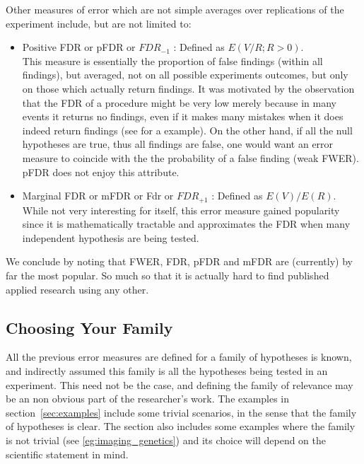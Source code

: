 \documentclass[review,12pt]{article}
\begin{document}
Other measures of error which are not simple averages over replications of the experiment include, but are not limited to:
\begin{itemize}

\item Positive FDR or pFDR \citep{storey_direct_2002} or $FDR_{-1}$ \citep{benjamini_discovering_2010} : Defined as $E(V/R;R>0)$.\\
This measure is essentially the proportion of false findings (within all findings), but averaged, not on all possible experiments outcomes, but only on those which actually return findings. It was motivated by the observation that the FDR of a procedure might be very low merely because in many events it returns no findings, even if it makes many mistakes when it does indeed return findings (see \citep{storey_direct_2002} for a example). 
On the other hand, if all the null hypotheses are true, thus all findings are false, one would want an error measure to coincide with the the probability of a false finding (weak FWER). pFDR does not enjoy this attribute.

\item Marginal FDR or mFDR \citep{sun_oracle_2007} or Fdr \citep{efron_microarrays_2008} or $FDR_{+1}$ \citep{benjamini_discovering_2010}: Defined as $E(V)/E(R)$. \\
While not very interesting for itself, this error measure gained popularity since it is mathematically tractable and approximates the FDR when many independent hypothesis are being tested. 

\end{itemize}


We conclude by noting that FWER, FDR, pFDR and mFDR are (currently) by far the most popular. So much so that it is actually hard to find published applied research using any other. 



\subsection{Choosing Your Family}
All the previous error measures are defined for a family of hypotheses is known, and indirectly assumed this family is all the hypotheses being tested in an experiment. This need not be the case, and defining the family of relevance may be an non obvious part of the researcher's work. The examples in section~\ref{sec:examples} include some trivial scenarios, in the sense that the family of hypotheses is clear. The section also includes some examples where the family is not trivial (see \ref{eg:imaging_genetics}) and its choice will depend on the scientific statement in mind.
\end{document}
